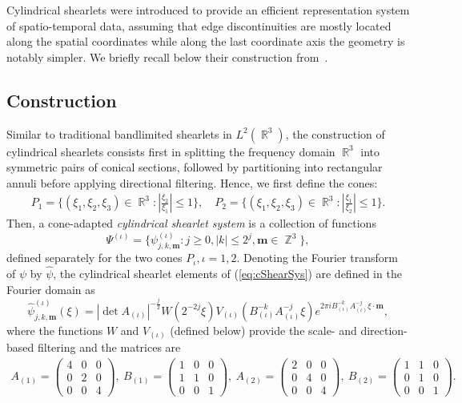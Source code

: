 \documentclass[11pt,a4paper]{article}
\numberwithin{equation}{section}
\DeclareMathOperator{\R}{\mathbb{R}}
\DeclareMathOperator{\Z}{\mathbb{Z}}
\newcommand{\abs}[1]{\left|#1\right|}
\newcommand{\m}{\vec{m}} %
\newcommand{\jkm}{{j, k, \m}} %
\newcommand{\gen}{\psi} %
\newcommand{\hatgen}{\widehat{\gen}}
\newcommand{\SHsys}{\Psi} %
\renewcommand{\vec}[1]{\boldsymbol{#1}} %
\begin{document}
Cylindrical shearlets were introduced to provide an efficient representation system of spatio-temporal data, assuming that edge discontinuities are mostly located along the spatial coordinates while along the last coordinate axis the geometry is notably simpler. 
We briefly recall below their construction from~\cite{Easley21}.

\subsection{Construction} \label{ssec:cylShConstruction}

Similar to traditional bandlimited shearlets in $L^2(\R^3)$, the construction of cylindrical shearlets consists first in splitting the frequency domain $\R^3$ into symmetric pairs of conical sections, followed by partitioning into rectangular annuli before applying directional filtering. Hence, we first define the cones:
\begin{align*}
    P_1 = \lbrace (\xi_1, \xi_2, \xi_3) \in \R^3 : \abs{\frac{\xi_2}{\xi_1}} \leq 1 \rbrace, \quad P_2 = \lbrace (\xi_1, \xi_2, \xi_3) \in \R^3 : \abs{\frac{\xi_1}{\xi_2}} \leq 1 \rbrace.
\end{align*}
Then, a cone-adapted \emph{cylindrical shearlet system} is a collection of functions
\begin{equation} \label{eq:cShearSys}
    \SHsys^{(\iota)} = \lbrace \psi^{(\iota)}_{\jkm} : j \geq 0, \abs{k} \leq 2^j, \vec{m} \in \Z^3 \rbrace,
\end{equation}
defined separately for the two cones $P_\iota, \iota=1,2$.
Denoting the Fourier transform of $\psi$ by $\hatgen$, the cylindrical shearlet elements of (\ref{eq:cShearSys}) are defined in the Fourier domain as
\begin{equation}    \label{eq:cShearSys2}
    \hatgen^{(\iota)}_{\jkm}(\xi) = \abs{\det A_{(\iota)}}^{-\frac{j}{2}} W(2^{-2j} \xi) V_{(\iota)} \left( B_{(\iota)}^{-k} A_{(\iota)}^{-j} \xi \right) e^{2\pi i B_{(\iota)}^{-k} A_{(\iota)}^{-j} \xi \cdot \vec{m}},
\end{equation}
where the functions $W$ and $V_{(\iota)}$ (defined below) provide the scale- and direction-based filtering and the matrices are
\begin{align}
    A_{(1)} = \begin{pmatrix}
    4 & 0 & 0 \\ 0 & 2 & 0 \\ 0 & 0 & 4
    \end{pmatrix}, \ B_{(1)} = \begin{pmatrix}
    1 & 0 & 0 \\ 1 & 1 & 0 \\ 0 & 0 & 1
    \end{pmatrix}, \ A_{(2)} = \begin{pmatrix}
    2 & 0 & 0 \\ 0 & 4 & 0 \\ 0 & 0 & 4
    \end{pmatrix}, \ B_{(2)} = \begin{pmatrix}
    1 & 1 & 0 \\ 0 & 1 & 0 \\ 0 & 0 & 1
    \end{pmatrix}.
\end{align}
\end{document}
